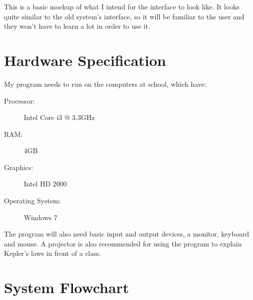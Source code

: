This is a basic mockup of what I intend for the interface to look like. It looks
quite similar to the old system's interface, so it will be familiar to the user
and they won't have to learn a lot in order to use it.

\section{Hardware Specification}

My program needs to run on the computers at school, which have:
\begin{description}
	\item[Processor:] Intel Core i3 @ 3.3GHz
	\item[RAM:] 4GB
	\item[Graphics:] Intel HD 2000
	\item[Operating System:] Windows 7
\end{description}

The program will also need basic input and output devices, a monitor, keyboard
and mouse. A projector is also recommended for using the program to explain
Kepler's laws in front of a class.

\section{System Flowchart}

